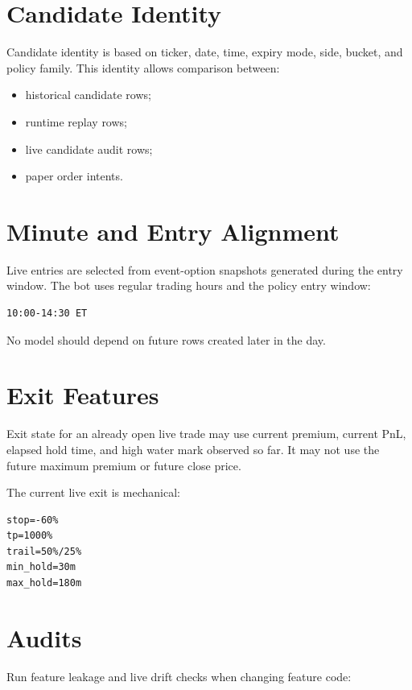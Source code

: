 \documentclass[11pt,a4paper]{article}
\begin{document}
\section{Candidate Identity}

Candidate identity is based on ticker, date, time, expiry mode, side, bucket, and policy family. This identity allows comparison between:

\begin{itemize}
  \item historical candidate rows;
  \item runtime replay rows;
  \item live candidate audit rows;
  \item paper order intents.
\end{itemize}

\section{Minute and Entry Alignment}

Live entries are selected from event-option snapshots generated during the entry window. The bot uses regular trading hours and the policy entry window:

\begin{lstlisting}
10:00-14:30 ET
\end{lstlisting}

No model should depend on future rows created later in the day.

\section{Exit Features}

Exit state for an already open live trade may use current premium, current PnL, elapsed hold time, and high water mark observed so far. It may not use the future maximum premium or future close price.

The current live exit is mechanical:

\begin{lstlisting}
stop=-60%
tp=1000%
trail=50%/25%
min_hold=30m
max_hold=180m
\end{lstlisting}

\section{Audits}

Run feature leakage and live drift checks when changing feature code:
\end{document}
